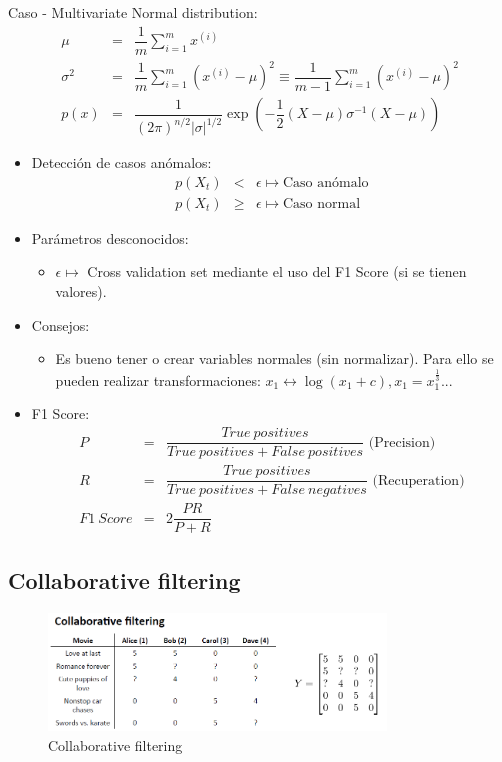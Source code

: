 \documentclass[12pt,a4paper]{article}
\begin{document}
Caso - Multivariate Normal distribution:
\begin{eqnarray*}
\mu &=& \dfrac{1}{m} \sum_{i=1}^{m} x^{(i)}\\
\sigma^{2} &=& \dfrac{1}{m} \sum_{i=1}^{m} (x^{(i)}-\mu)^2 \equiv \dfrac{1}{m-1} \sum_{i=1}^{m} (x^{(i)}-\mu)^2 \\
p(x) &=& \dfrac{1}{(2 \pi)^{n/2} |\sigma|^{1/2}} \exp(- \dfrac{1}{2} (X-\mu) \sigma^{-1} (X-\mu)) 
\end{eqnarray*}


\begin{itemize}
\item Detección de casos anómalos:
\begin{eqnarray*}
 p(X_t) & < & \epsilon \longmapsto \mbox{Caso anómalo}\\
 p(X_t) & \geq & \epsilon \longmapsto \mbox{Caso normal}
\end{eqnarray*}

\item Parámetros desconocidos:
\begin{itemize}
\item $\epsilon \longmapsto$  Cross validation set mediante el uso del F1 Score (si se tienen valores).
\end{itemize}
\item Consejos:
\begin{itemize}
\item Es bueno tener o crear variables normales (sin normalizar). Para ello se pueden realizar transformaciones: $x_1 \longleftrightarrow \log(x_1+c), x_1 = x_1^{\frac{1}{3}}$...
\end{itemize}
\item F1 Score:
\begin{eqnarray*}
P&=& \dfrac{True~positives}{True~positives+False~positives}     \mbox{ (Precision)}\\
R&=& \dfrac{True~positives}{True~positives+False~negatives}    \mbox{ (Recuperation)} \\
F1~Score &=& 2 \dfrac{P R}{P+R}
\end{eqnarray*}
\end{itemize}




\newpage

\subsection{Collaborative filtering}
\begin{figure}[htb]
\center
\includegraphics[width=0.8\textwidth]{cola_filt}
\caption{Collaborative filtering}
\end{figure}
\end{document}

